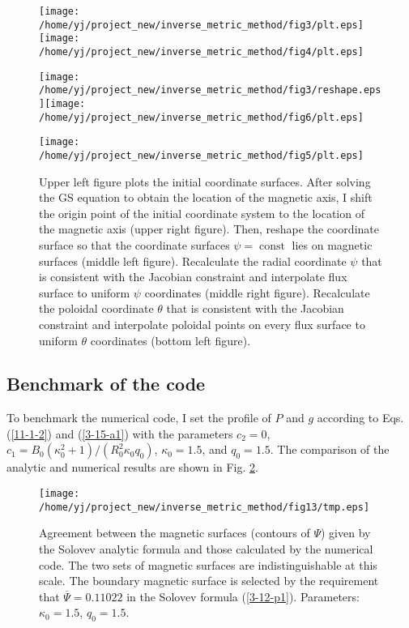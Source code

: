 \documentclass{llncs}
\newcommand{\tmop}[1]{\ensuremath{\operatorname{#1}}}
\begin{document}
\begin{figure}[h]
  \texttt{[image: /home/yj/project\_new/inverse\_metric\_method/fig3/plt.eps]}\texttt{[image: /home/yj/project\_new/inverse\_metric\_method/fig4/plt.eps]}
  
  \texttt{[image: /home/yj/project\_new/inverse\_metric\_method/fig3/reshape.eps]}\texttt{[image: /home/yj/project\_new/inverse\_metric\_method/fig6/plt.eps]}
  
  \texttt{[image: /home/yj/project\_new/inverse\_metric\_method/fig5/plt.eps]}
  \caption{\label{12-26-1}Upper left figure plots the initial coordinate
  surfaces. After solving the GS equation to obtain the location of the
  magnetic axis, I shift the origin point of the initial coordinate system to
  the location of the magnetic axis (upper right figure). Then, reshape the
  coordinate surface so that the coordinate surfaces $\psi = \tmop{const}$
  lies on magnetic surfaces (middle left figure). Recalculate the radial
  coordinate $\psi$ that is consistent with the Jacobian constraint and
  interpolate flux surface to uniform $\psi$ coordinates (middle right
  figure). Recalculate the poloidal coordinate $\theta$ that is consistent
  with the Jacobian constraint and interpolate poloidal points on every flux
  surface to uniform $\theta$ coordinates (bottom left figure).}
\end{figure}

\subsection{Benchmark of the code}

To benchmark the numerical code, I set the profile of $P$ and $g$ according to
Eqs. (\ref{11-1-2}) and (\ref{3-15-a1}) with the parameters $c_2 = 0$, $c_1 =
B_0 (\kappa_0^2 + 1) / (R_0^2 \kappa_0 q_0)$, $\kappa_0 = 1.5$, and $q_0 =
1.5$. The comparison of the analytic and numerical results are shown in Fig.
\ref{3-15-a2}.

\begin{figure}[h]
  \texttt{[image: /home/yj/project\_new/inverse\_metric\_method/fig13/tmp.eps]}
  \caption{\label{3-15-a2}Agreement between the magnetic surfaces (contours of
  $\Psi$) given by the Solovev analytic formula and those calculated by the
  numerical code. The two sets of magnetic surfaces are indistinguishable at
  this scale. The boundary magnetic surface is selected by the requirement
  that $\overline{\Psi} = 0.11022$ in the Solovev formula (\ref{3-12-p1}).
  Parameters: $\kappa_0 = 1.5$, $q_0 = 1.5$.}
\end{figure}
\end{document}
